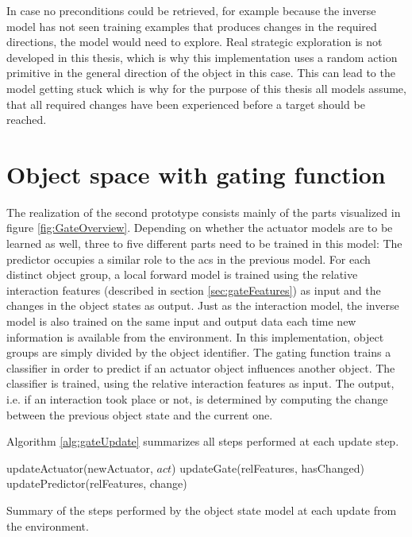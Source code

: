 In case no preconditions could be retrieved, for example because the inverse model has not seen training examples that produces changes in the required directions, the model would need to explore. Real strategic exploration is not developed in this thesis, which is why this implementation uses a random action primitive in the general direction of the object in this case. This can lead to the model getting stuck which is why for the purpose of this thesis all models assume, that all required changes have been experienced before a target should be reached.


\section{Object space with gating function \label{sec:gateRealization}}

The realization of the second prototype consists mainly of the parts visualized in figure \ref{fig:GateOverview}. 
Depending on whether the actuator models are to be learned as well, three to five different parts need to be trained in this model: The predictor occupies a similar role to the \glspl{ac} in the previous model. For each distinct object group, a local forward model is trained using the relative interaction features (described in section \ref{sec:gateFeatures}) as input and the changes in the object states as output. Just as the interaction model, the inverse model is also trained on the same input and output data each time new information is available from the environment. 
In this implementation, object groups are simply divided by the object identifier. 
The gating function trains a classifier in order to predict if an actuator object influences another object. The classifier is trained, using the relative interaction features as input. The output, i.e. if an interaction took place or not, is determined by computing the change between the previous object state and the current one.

Algorithm \ref{alg:gateUpdate} summarizes all steps performed at each update step.

\begin{algorithm}
\begin{algorithmic}[1]
	\Statex
	\State updateActuator(newActuator, $act$)
		\State updateGate(relFeatures, hasChanged)
			\State updatePredictor(relFeatures, change)
		\EndIf
	\EndFor
\end{algorithmic}
\caption{Summary of the steps performed by the object state model at each update from the environment.}
\label{alg:gateUpdate}
\end{algorithm}



